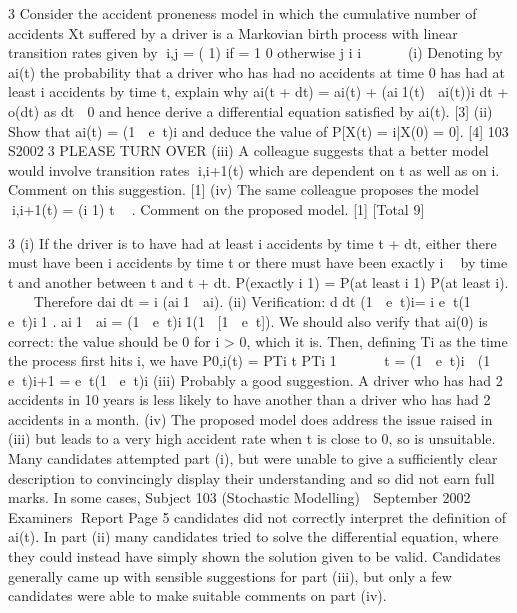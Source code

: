 \documentclass[a4paper,12pt]{article}
\begin{document}
3 Consider the accident proneness model in which the cumulative number of accidents
Xt suffered by a driver is a Markovian birth process with linear transition rates given
by
i,j =
( 1) if = 1
0 otherwise
j i i    
(i) Denoting by ai(t) the probability that a driver who has had no accidents at
time 0 has had at least i accidents by time t, explain why
ai(t + dt) = ai(t) + (ai1(t)  ai(t))i
dt + o(dt)
as dt  0 and hence derive a differential equation satisfied by ai(t). [3]
(ii) Show that
ai(t) = (1  et)i
and deduce the value of P[X(t) = i|X(0) = 0]. [4]
103 S20023 PLEASE TURN OVER
(iii) A colleague suggests that a better model would involve transition rates i,i+1(t)
which are dependent on t as well as on i. Comment on this suggestion. [1]
(iv) The same colleague proposes the model i,i+1(t) = (i 1)
t
 . Comment on the
proposed model. [1]
[Total 9]



3 (i) If the driver is to have had at least i accidents by time t + dt, either there must
have been i accidents by time t or there must have been exactly i 	 by time t
and another between t and t + dt.
P(exactly i 1) = P(at least i 1) P(at least i).   
Therefore
dai
dt
= i
(ai1  ai).
(ii) Verification: d
dt
{(1  et)i}= i
et(1  et)i1 .
ai1  ai = (1  et)i1(1 [1  et]).
We should also verify that ai(0) is correct: the value should be 0 for i > 0,
which it is.
Then, defining Ti as the time the process first hits i, we have
P0,i(t) = P{Ti t} P{Ti 1 
    t} = (1  et)i  (1  et)i+1 = et(1 et)i
(iii)  Probably a good suggestion. A driver who has had 2 accidents in 10 years is
less likely to have another than a driver who has had 2 accidents in a month.
(iv) The proposed model does address the issue raised in (iii) but leads to a very
high accident rate when t is close to 0, so is unsuitable.
Many candidates attempted part (i), but were unable to give a sufficiently clear description to
convincingly display their understanding and so did not earn full marks. In some cases,
Subject 103 (Stochastic Modelling)  September 2002  Examiners Report
Page 5
candidates did not correctly interpret the definition of ai(t). In part (ii) many candidates tried
to solve the differential equation, where they could instead have simply shown the solution
given to be valid. Candidates generally came up with sensible suggestions for part (iii), but
only a few candidates were able to make suitable comments on part (iv).
\end{document}
